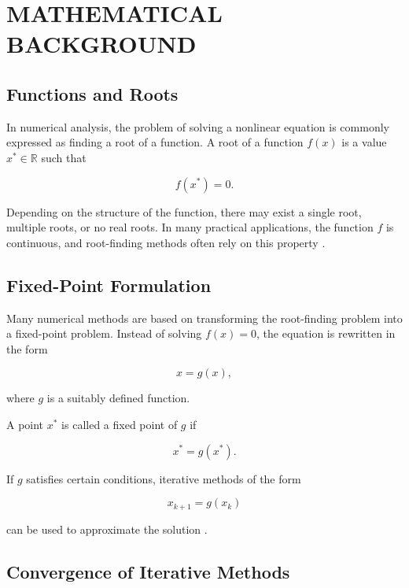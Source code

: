 \chapter{\MakeUppercase{Mathematical Background}}

\section{Functions and Roots}

In numerical analysis, the problem of solving a nonlinear equation is commonly expressed as finding a root of a function. A root of a function \( f(x) \) is a value \( x^* \in \mathbb{R} \) such that

\begin{equation}
f(x^*) = 0.
\end{equation}

Depending on the structure of the function, there may exist a single root, multiple roots, or no real roots. In many practical applications, the function \( f \) is continuous, and root-finding methods often rely on this property \cite{burden, atkinson}.

\section{Fixed-Point Formulation}

Many numerical methods are based on transforming the root-finding problem into a fixed-point problem. Instead of solving \( f(x) = 0 \), the equation is rewritten in the form

\begin{equation}
x = g(x),
\end{equation}

where \( g \) is a suitably defined function.

A point \( x^* \) is called a fixed point of \( g \) if

\begin{equation}
x^* = g(x^*).
\end{equation}

If \( g \) satisfies certain conditions, iterative methods of the form

\begin{equation}
x_{k+1} = g(x_k)
\end{equation}

can be used to approximate the solution \cite{burden}.

\section{Convergence of Iterative Methods}


